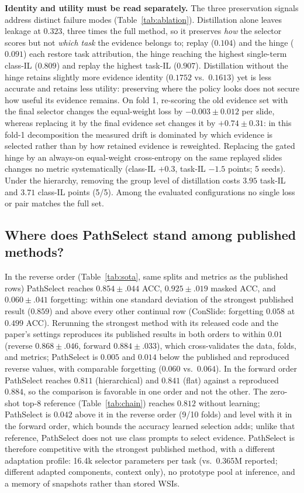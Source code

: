 \documentclass{article}
\begin{document}
\textbf{Identity and utility must be read separately.} The three preservation signals address distinct failure modes (Table~\ref{tab:ablation}). Distillation alone leaves leakage at $0.323$, three times the full method, so it preserves \emph{how} the selector scores but not \emph{which task} the evidence belongs to; replay ($0.104$) and the hinge ($0.091$) each restore task attribution, the hinge reaching the highest single-term class-IL ($0.809$) and replay the highest task-IL ($0.907$). Distillation without the hinge retains slightly more evidence identity ($0.1752$ vs.\ $0.1613$) yet is less accurate and retains less utility: preserving where the policy looks does not secure how useful its evidence remains. On fold 1, re-scoring the old evidence set with the final selector changes the equal-weight loss by $-0.003{\pm}0.012$ per slide, whereas replacing it by the final evidence set changes it by $+0.74{\pm}0.31$: in this fold-1 decomposition the measured drift is dominated by which evidence is selected rather than by how retained evidence is reweighted. Replacing the gated hinge by an always-on equal-weight cross-entropy on the same replayed slides changes no metric systematically (class-IL $+0.3$, task-IL $-1.5$ points; 5 seeds). Under the hierarchy, removing the group level of distillation costs $3.95$ task-IL and $3.71$ class-IL points (5/5). Among the evaluated configurations no single loss or pair matches the full set.

\subsection{Where does PathSelect stand among published methods?}
\label{ssec:sota}



In the reverse order (Table~\ref{tab:sota}, same splits and metrics as the published rows) PathSelect reaches $0.854{\pm}.044$ ACC, $0.925{\pm}.019$ masked ACC, and $0.060{\pm}.041$ forgetting: within one standard deviation of the strongest published result ($0.859$) and above every other continual row (ConSlide: forgetting $0.058$ at $0.499$ ACC). Rerunning the strongest method with its released code and the paper's settings reproduces its published results in both orders to within $0.01$ (reverse $0.868{\pm}.046$, forward $0.884{\pm}.033$), which cross-validates the data, folds, and metrics; PathSelect is $0.005$ and $0.014$ below the published and reproduced reverse values, with comparable forgetting ($0.060$ vs.\ $0.064$). In the forward order PathSelect reaches $0.811$ (hierarchical) and $0.841$ (flat) against a reproduced $0.884$, so the comparison is favorable in one order and not the other. The zero-shot top-8 reference (Table~\ref{tab:chain}) reaches $0.812$ without learning; PathSelect is $0.042$ above it in the reverse order (9/10 folds) and level with it in the forward order, which bounds the accuracy learned selection adds; unlike that reference, PathSelect does not use class prompts to select evidence. PathSelect is therefore competitive with the strongest published method, with a different adaptation profile: 16.4k selector parameters per task (vs.\ $0.365$M reported; different adapted components, context only), no prototype pool at inference, and a memory of snapshots rather than stored WSIs.
\end{document}

